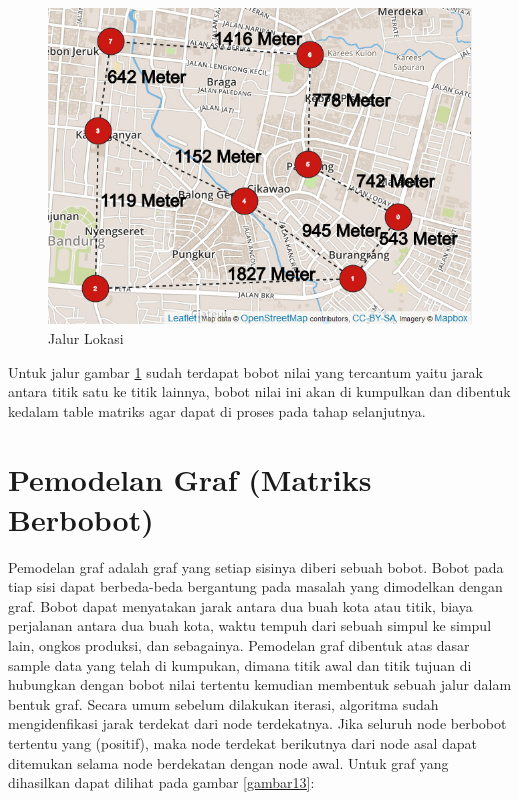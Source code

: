 \begin{figure}[h]
    \centering
    \includegraphics[scale=0.3]{figures/ALGORITMA/DATAMAP2.jpeg}
    \caption{Jalur Lokasi}
    \label{gambar22}
\end{figure}
    
\par Untuk jalur gambar \ref{gambar22} sudah terdapat bobot nilai yang tercantum yaitu jarak antara titik satu ke titik lainnya, bobot nilai ini akan di kumpulkan dan dibentuk kedalam table matriks agar dapat di proses pada tahap selanjutnya.
    
    
    
    

\section{Pemodelan Graf (Matriks Berbobot)}
\label{pemodelan_graf}
Pemodelan graf adalah graf yang setiap sisinya diberi sebuah bobot. Bobot pada tiap sisi dapat berbeda-beda bergantung pada masalah yang dimodelkan dengan graf. Bobot dapat menyatakan jarak antara dua buah kota atau titik, biaya perjalanan antara dua buah kota, waktu tempuh dari sebuah simpul ke simpul lain, ongkos produksi, dan sebagainya. Pemodelan graf dibentuk atas dasar sample data yang telah di kumpukan, dimana titik awal dan titik tujuan di hubungkan dengan bobot nilai tertentu kemudian membentuk sebuah jalur dalam bentuk graf. Secara umum sebelum dilakukan iterasi, algoritma sudah mengidenfikasi jarak terdekat dari node terdekatnya. Jika seluruh node berbobot tertentu yang (positif), maka node terdekat berikutnya dari node asal dapat ditemukan selama node berdekatan dengan node awal. Untuk graf yang dihasilkan dapat dilihat pada gambar \ref{gambar13}:

